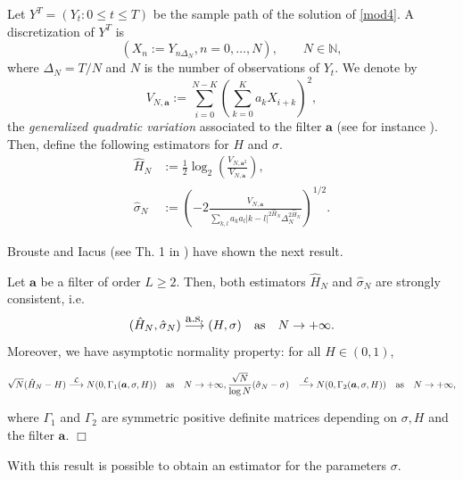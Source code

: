 \documentclass[smallextended]{svjour3}
\newcommand{\IN}{{\mathbb N}}
\begin{document}
Let $Y^T=(Y_t: 0\le t\le T)$ be  the sample path of the solution of
\eqref{mod4}. A discretization of $Y^T$ is
\[
(X_n:=Y_{n\Delta_N}, n=0,\ldots,N),\qquad
N\in \IN,
\]
where $\Delta_N=T/N$ and $N$ is the number of observations of $Y_t$. We denote
by
\begin{equation*}
V_{N,\bm{a}}:= \sum_{i=0}^{N-K}\left( \sum_{k=0}^K a_k X_{i+k} \right)^2,
\end{equation*}
the {\it generalized quadratic variation} associated to the filter $\bm{a}$
(see for instance \cite{is-la}). Then, define the
following estimators for $H$ and $\sigma$.
\begin{align}
    \hat{H}_N &:=
    \tfrac{1}{2} \log_2 
    \left(
        \frac{
        	V_{N,\bm{a}^2}
        }{
        	V_{N,\bm{a}}
        }
    \right), \label{est1}
    \\
    \hat{\sigma}_N
    	&:=\left(
    		-2
    		\frac{V_{N,\bm{a}}}{\sum_{k,l} a_ka_l |k-l|^{2\hat{H}_N} 
    	    \Delta_N^{2 \hat{H}_N } }\right)^{1/2}.
    	\label{est2}
\end{align}

Brouste and Iacus (see Th. 1 in \cite{br-ia}) have shown the next result.
\begin{theorem}
    Let  $\bm{a}$ be a filter of order $L \ge 2$. Then, both estimators
    $\hat{H}_N$ and $\hat{\sigma}_N$  are
    strongly consistent, i.e.
    \[
    ( \hat{H}_N,\hat{\sigma}_N) \stackrel{\hbox{\rm a.s.}}{\longrightarrow}
    (H,\sigma) \quad \hbox{\rm as}\quad N \rightarrow+\infty.
    \]
    Moreover, we have asymptotic normality property:  for all $H \in (0, 1)$,

    \begin{align*}
    \sqrt{N} (\hat{H}_N  - H ) &\stackrel{\mathcal{L}}{\longrightarrow} N (0,
    \Gamma_1 ( \bm{a},\sigma,H)) \quad  \hbox{\rm as} \quad N
    \rightarrow +\infty,
    \frac{\sqrt{N}}{\log N} ( \hat{\sigma}_N  - \sigma )
    &\stackrel{\mathcal{L}}{\longrightarrow} N (0, \Gamma_2 (\bm{a},\sigma,H))
    \quad
    \hbox{\rm as} \quad N \rightarrow +\infty,
    \end{align*}

    where $\Gamma_1$ and $\Gamma_2$ are symmetric positive definite matrices
    depending on $\sigma, H$ and the filter $\bm{a}$.
    \hfill$\Box$
\end{theorem}

With this result is possible to obtain an estimator for the parameters
$\sigma$.
\end{document}
